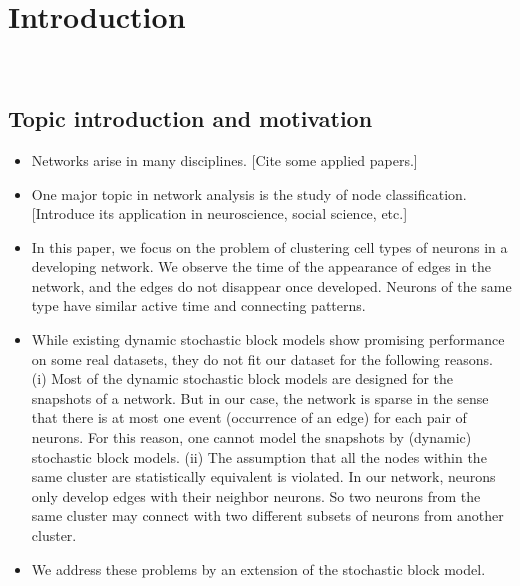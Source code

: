 

\section{Introduction}
~ 

\subsection*{Topic introduction and motivation}
\begin{itemize}
	\item Networks arise in many disciplines. [Cite some applied papers.]
	\item One major topic in network analysis is the study of node classification. [Introduce its application in neuroscience, social science, etc.]
	\item In this paper, we focus on the problem of clustering cell types of neurons in a developing network. 
	We observe the time of the appearance of edges in the network, and the edges do not disappear once developed.
	Neurons of the same type have similar active time and connecting patterns.
	\item While existing dynamic stochastic block models show promising performance on some real datasets, they do not fit our dataset for the following reasons.
	 (i) Most of the dynamic stochastic block models are designed for the snapshots of a network. But in our case, the network is sparse in the sense that there is at most one event (occurrence of an edge) for each pair of neurons. For this reason, one cannot model the snapshots by (dynamic) stochastic block models.
	 (ii) The assumption that all the nodes within the same cluster are statistically equivalent is violated. In our network, neurons only develop edges with their neighbor neurons. So two neurons from the same cluster may connect with two different subsets of neurons from another cluster.
	\item We address these problems by an extension of the stochastic block model.
\end{itemize}

